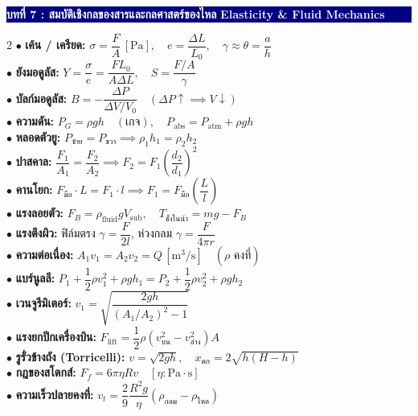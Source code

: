 \documentclass[10pt, a5paper]{article}
\newcommand{\boxheader}[2]{%
  \noindent\colorbox{navy}{\parbox{\dimexpr\linewidth-2\fboxsep}{%
    \textbf{\textcolor{white}{\small #1}} \hfill \textbf{\textcolor{white}{\scriptsize #2}}%
  }}\vspace{1.5pt}%
}
\begin{document}
\boxheader{บทที่ 7 : สมบัติเชิงกลของสารและกลศาสตร์ของไหล}{Elasticity \& Fluid Mechanics}
\begin{tcolorbox}[colback=boxbg, colframe=navy, boxrule=0.6pt, arc=1.5pt, left=3pt, right=3pt, top=2.5pt, bottom=2.5pt]
\begin{multicols}{2}
\setlength{\columnsep}{6pt}
{\fontsize{7.8}{9.5}\selectfont
$\bullet$ \textbf{เค้น / เครียด:} $\sigma = \dfrac{F}{A}\,\left[\text{Pa}\right], \quad e = \dfrac{\Delta L}{L_0}, \quad \gamma \approx \theta = \dfrac{a}{h}$\\[1pt]
$\bullet$ \textbf{ยังมอดูลัส:} $Y = \dfrac{\sigma}{e} = \dfrac{F L_0}{A \Delta L}, \quad S = \dfrac{F/A}{\gamma}$\\[1pt]
$\bullet$ \textbf{บัลก์มอดูลัส:} $B = -\dfrac{\Delta P}{\Delta V / V_0} \quad (\Delta P \uparrow \implies V \downarrow)$\\[1pt]
$\bullet$ \textbf{ความดัน:} $P_G = \rho gh \quad (\text{เกจ}), \quad P_{\text{abs}} = P_{\text{atm}} + \rho gh$\\[1pt]
$\bullet$ \textbf{หลอดตัวยู:} $P_{\text{ซ้าย}} = P_{\text{ขวา}} \implies \rho_1 h_1 = \rho_2 h_2$\\[1pt]
$\bullet$ \textbf{ปาสคาล:} $\dfrac{F_1}{A_1} = \dfrac{F_2}{A_2} \implies F_2 = F_1\left(\dfrac{d_2}{d_1}\right)^2$\\[1pt]
$\bullet$ \textbf{คานโยก:} $F_{\text{มือ}} \cdot L = F_1 \cdot l \implies F_1 = F_{\text{มือ}}\left(\dfrac{L}{l}\right)$\\[1pt]
$\bullet$ \textbf{แรงลอยตัว:} $F_B = \rho_{\text{fluid}} g V_{\text{sub}}, \quad T_{\text{ชั่งในน้ำ}} = mg - F_B$\\[1pt]
$\bullet$ \textbf{แรงตึงผิว:} ฟิล์มตรง $\gamma = \dfrac{F}{2l}$, ห่วงกลม $\gamma = \dfrac{F}{4\pi r}$\\[1pt]
$\bullet$ \textbf{ความต่อเนื่อง:} $A_1 v_1 = A_2 v_2 = Q\,\left[\text{m}^3/\text{s}\right] \quad (\rho \text{ คงที่})$\\[1pt]
$\bullet$ \textbf{แบร์นูลลี:} $P_1 + \dfrac{1}{2}\rho v_1^2 + \rho gh_1 = P_2 + \dfrac{1}{2}\rho v_2^2 + \rho gh_2$\\[1pt]
$\bullet$ \textbf{เวนจูรีมิเตอร์:} $v_1 = \sqrt{\dfrac{2gh}{(A_1/A_2)^2 - 1}}$\\[1pt]
$\bullet$ \textbf{แรงยกปีกเครื่องบิน:} $F_{\text{lift}} = \dfrac{1}{2}\rho(v_{\text{บน}}^2 - v_{\text{ล่าง}}^2)A$\\[1pt]
$\bullet$ \textbf{รูรั่วข้างถัง (Torricelli):} $v = \sqrt{2gh}, \quad x_{\text{ตก}} = 2\sqrt{h(H-h)}$\\[1pt]
$\bullet$ \textbf{กฎของสโตกส์:} $F_f = 6\pi\eta R v \quad [\eta: \text{Pa}\cdot\text{s}]$\\[1pt]
$\bullet$ \textbf{ความเร็วปลายคงที่:} $v_t = \dfrac{2}{9}\dfrac{R^2 g}{\eta}(\rho_{\text{กลม}} - \rho_{\text{ไหล}})$
}
\end{multicols}
\end{tcolorbox}
\vspace{-2pt}
\end{document}
